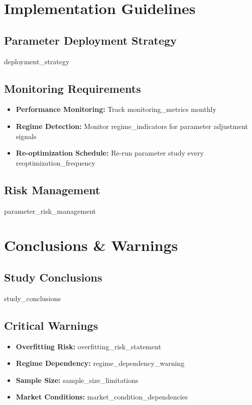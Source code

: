 \documentclass[11pt,a4paper]{article}
\begin{document}
\section{Implementation Guidelines}

\subsection{Parameter Deployment Strategy}
{{deployment_strategy}}

\subsection{Monitoring Requirements}
\begin{itemize}
\item \textbf{Performance Monitoring:} Track {{monitoring_metrics}} monthly
\item \textbf{Regime Detection:} Monitor {{regime_indicators}} for parameter adjustment signals
\item \textbf{Re-optimization Schedule:} Re-run parameter study every {{reoptimization_frequency}}
\end{itemize}

\subsection{Risk Management}
{{parameter_risk_management}}

\section{Conclusions \& Warnings}

\subsection{Study Conclusions}
{{study_conclusions}}

\subsection{Critical Warnings}
\begin{itemize}
\item \textcolor{warning}{\textbf{Overfitting Risk:}} {{overfitting_risk_statement}}
\item \textcolor{warning}{\textbf{Regime Dependency:}} {{regime_dependency_warning}}  
\item \textcolor{warning}{\textbf{Sample Size:}} {{sample_size_limitations}}
\item \textcolor{warning}{\textbf{Market Conditions:}} {{market_condition_dependencies}}
\end{itemize}
\end{document}
